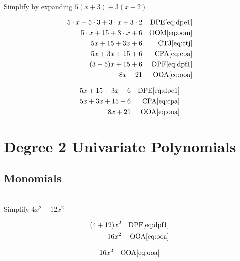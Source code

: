 \documentclass[20150903-160354-rs2.2-MarksMathNotebook.tex]{subfiles}
\begin{document}
\begin{example}[id:20141109-095842] \label{20141109-095842}  \hfill \\

Simplify by expanding $5(x+3)+3(x+2)$

\soln

\solnsteps
\begin{align*}
5 \cdot x + 5 \cdot 3 + 3 \cdot x + 3 \cdot 2 && \text{DPE} \eqref{eq:dpe1} \\
5 \cdot x + 15 + 3 \cdot x + 6 && \text{OOM} \eqref{eq:oom} \\
5x + 15 + 3x+6 && \text{CTJ} \eqref{eq:ctj} \\
5x +3x+ 15 + 6 && \text{CPA} \eqref{eq:cpa} \\
(3+5)x+15+6 && \text{DPF} \eqref{eq:dpf1} \\
8x+21 && \text{OOA} \eqref{eq:ooa}
\end{align*}

\soln

\lesssteps
\begin{align*}
5x + 15 +3x+6 && \text{DPE} \eqref{eq:dpe1} \\
5x+3x+15+6 && \text{CPA} \eqref{eq:cpa} \\
8x+21 && \text{OOA} \eqref{eq:ooa}
\end{align*}

\end{example}

\section{Degree 2 Univariate Polynomials}

\subsection*{Monomials}

\begin{example}[id:20141106-151138] \label{20141106-151138}  \hfill \\

Simplify $4x^2+12x^2$

\soln

\solnsteps
\begin{align*}
(4+12)x^2 && \text{DPF} \eqref{eq:dpf1} \\
16x^2 && \text{OOA} \eqref{eq:ooa}
\end{align*}

\soln

\lesssteps
\begin{align*}
16x^2 && \text{OOA} \eqref{eq:ooa}
\end{align*}

\end{example}
\end{document}
